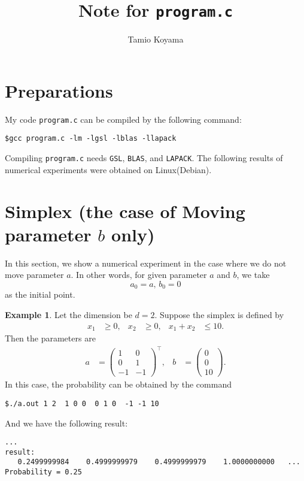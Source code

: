 \documentclass[12pt]{article}
\title{Note for {\tt program.c}}
\author{Tamio Koyama}
\date{}
\theoremstyle{definition}
\newtheorem{example}{Example}
\begin{document}
\maketitle
\section{Preparations}
My code {\tt program.c} can be compiled by the following command:
\begin{framed}
\begin{verbatim}
$gcc program.c -lm -lgsl -lblas -llapack
\end{verbatim}
\end{framed}
Compiling {\tt program.c} needs {\tt GSL}, {\tt BLAS}, and {\tt LAPACK}.
The following results of numerical experiments were obtained 
on Linux(Debian).

\section{Simplex (the case of Moving parameter $b$ only)}
In this section, we show a numerical experiment in the case where
we do not move parameter $a$.
In other words, for given parameter $a$ and $b$, we take 
$$
a_0 = a,\,b_0 = 0
$$
as the initial point.

\begin{example}
Let the dimension be $d=2$.
Suppose the simplex is defined by 
\begin{align*}
  x_1 &\geq 0, & x_2&\geq 0, & x_1+x_2&\leq 10.
\end{align*}
Then the parameters are
\begin{align*}
  a &= \begin{pmatrix} 1 & 0 \\ 0 & 1 \\ -1 & -1  \end{pmatrix}^\top, &
  b &= \begin{pmatrix} 0 \\ 0 \\ 10 \end{pmatrix}.
\end{align*}
In this case, the probability can be obtained by the command
\begin{framed}
\begin{verbatim}
$./a.out 1 2  1 0 0  0 1 0  -1 -1 10
\end{verbatim}
\end{framed}
And we have the following result:
\begin{framed}
\begin{verbatim}
...
result:
   0.2499999984    0.4999999979    0.4999999979    1.0000000000   ...
Probability = 0.25
\end{verbatim}
\end{framed}
\end{example}
\fi
\end{document}
